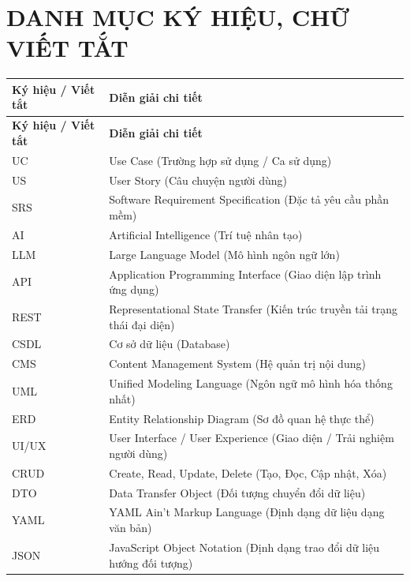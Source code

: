 \documentclass[13pt,a4paper,oneside]{extreport}
\numberwithin{equation}{chapter}
\numberwithin{figure}{chapter}
\numberwithin{table}{chapter}
\begin{document}
\tableofcontents

\clearpage
\chapter*{DANH MỤC KÝ HIỆU, CHỮ VIẾT TẮT}
\begin{center}
  \begin{longtable}{|>{\centering\arraybackslash}p{}|p{}|}
    \hline
    \rowcolor[gray]{0.9} \textbf{Ký hiệu / Viết tắt} & \textbf{Diễn giải chi tiết} \\
    \hline
    \endfirsthead
    \hline
    \rowcolor[gray]{0.9} \textbf{Ký hiệu / Viết tắt} & \textbf{Diễn giải chi tiết} \\
    \hline
    \endhead
    \hline
    \endfoot
    UC & Use Case (Trường hợp sử dụng / Ca sử dụng) \\ \hline
    US & User Story (Câu chuyện người dùng) \\ \hline
    SRS & Software Requirement Specification (Đặc tả yêu cầu phần mềm) \\ \hline
    AI & Artificial Intelligence (Trí tuệ nhân tạo) \\ \hline
    LLM & Large Language Model (Mô hình ngôn ngữ lớn) \\ \hline
    API & Application Programming Interface (Giao diện lập trình ứng dụng) \\ \hline
    REST & Representational State Transfer (Kiến trúc truyền tải trạng thái đại diện) \\ \hline
    CSDL & Cơ sở dữ liệu (Database) \\ \hline
    CMS & Content Management System (Hệ quản trị nội dung) \\ \hline
    UML & Unified Modeling Language (Ngôn ngữ mô hình hóa thống nhất) \\ \hline
    ERD & Entity Relationship Diagram (Sơ đồ quan hệ thực thể) \\ \hline
    UI/UX & User Interface / User Experience (Giao diện / Trải nghiệm người dùng) \\ \hline
    CRUD & Create, Read, Update, Delete (Tạo, Đọc, Cập nhật, Xóa) \\ \hline
    DTO & Data Transfer Object (Đối tượng chuyển đổi dữ liệu) \\ \hline
    YAML & YAML Ain't Markup Language (Định dạng dữ liệu dạng văn bản) \\ \hline
    JSON & JavaScript Object Notation (Định dạng trao đổi dữ liệu hướng đối tượng) \\ \hline

\end{longtable}
\end{center}
\end{document}
